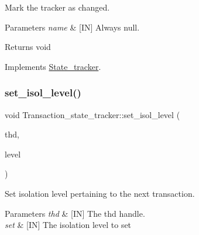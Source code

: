 Mark the tracker as changed. 


\begin{DoxyParams}{Parameters}
{\em name} & \mbox{[}IN\mbox{]} Always null.\\
\hline
\end{DoxyParams}
\begin{DoxyReturn}{Returns}
void 
\end{DoxyReturn}


Implements \mbox{\hyperlink{classState__tracker_afb865d3837c0f8fc9cd36d5234142b32}{State\+\_\+tracker}}.

\mbox{\label{classTransaction__state__tracker_aaa609102617808d57f15dbe92a278019}} 
\subsubsection{\texorpdfstring{set\+\_\+isol\+\_\+level()}{set\_isol\_level()}}
{\footnotesize\ttfamily void Transaction\+\_\+state\+\_\+tracker\+::set\+\_\+isol\+\_\+level (\begin{DoxyParamCaption}\item[{T\+HD $\ast$}]{thd,  }\item[{enum enum\+\_\+tx\+\_\+isol\+\_\+level}]{level }\end{DoxyParamCaption})}



Set isolation level pertaining to the next transaction. 


\begin{DoxyParams}{Parameters}
{\em thd} & \mbox{[}IN\mbox{]} The thd handle. \\
\hline
{\em set} & \mbox{[}IN\mbox{]} The isolation level to set \\
\hline
\end{DoxyParams}
\mbox{\label{classTransaction__state__tracker_a89dd20a6792185119d322594f8c5a420}} 
